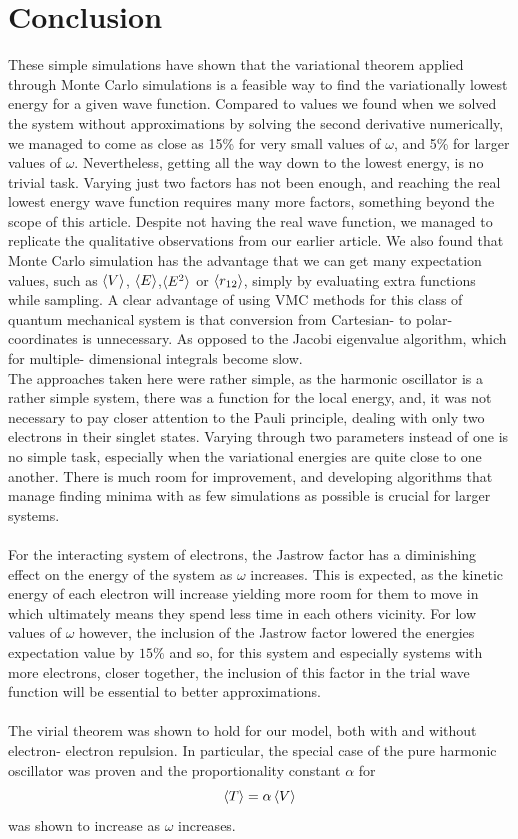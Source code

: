 \documentclass[10pt,a4paper]{article}
\begin{document}
\section{Conclusion}
These simple simulations have shown that the variational theorem applied through Monte Carlo simulations is a feasible way to find the variationally lowest energy for a given wave function. Compared to values we found when we solved the system without approximations by solving the second derivative numerically, we managed to come as close as 15\% for very small values of $\omega$, and 5\% for larger values of $\omega$. Nevertheless, getting all the way down to the lowest energy, is no trivial task. Varying just two factors has not been enough, and reaching the real lowest energy wave function requires many more factors, something beyond the scope of this article. Despite not having the real wave function, we managed to replicate the qualitative observations from our earlier article. We also found that Monte Carlo simulation has the advantage that we can get many expectation values, such as $\braket{V}$, $\braket{E}$,$\braket{E^2}$ or $\braket{r_{12}}$, simply by evaluating extra functions while sampling. A clear advantage of using VMC methods for this class of quantum mechanical system is that conversion from Cartesian- to polar- coordinates is unnecessary. As opposed to the Jacobi eigenvalue algorithm, which for multiple- dimensional integrals become slow.\\The approaches taken here were rather simple, as the harmonic oscillator is a rather simple system, there was a function for the local energy, and, it was not necessary to pay closer attention to the Pauli principle, dealing with only two electrons in their singlet states. Varying through two parameters instead of one is no simple task, especially when the variational energies are quite close to one another. There is much room for improvement, and developing algorithms that manage finding minima with as few simulations as possible is crucial for larger systems.\\\\For the interacting system of electrons, the Jastrow factor has a diminishing effect on the energy of the system as $\omega$ increases. This is expected, as the kinetic energy of each electron will increase yielding more room for them to move in which ultimately means they spend less time in each others vicinity. For low values of $\omega$ however, the inclusion of the Jastrow factor lowered the energies expectation value by $15\%$ and so, for this system and especially systems with more electrons, closer together, the inclusion of this factor in the trial wave function will be essential to better approximations.\\\\The virial theorem was shown to hold for our model, both with and without electron- electron repulsion. In particular, the special case of the pure harmonic oscillator was proven and the proportionality constant $\alpha$ for
\begin{equation}
\braket{T} = \alpha \braket{V}
\end{equation}
was shown to increase as $\omega$ increases.
\end{document}
